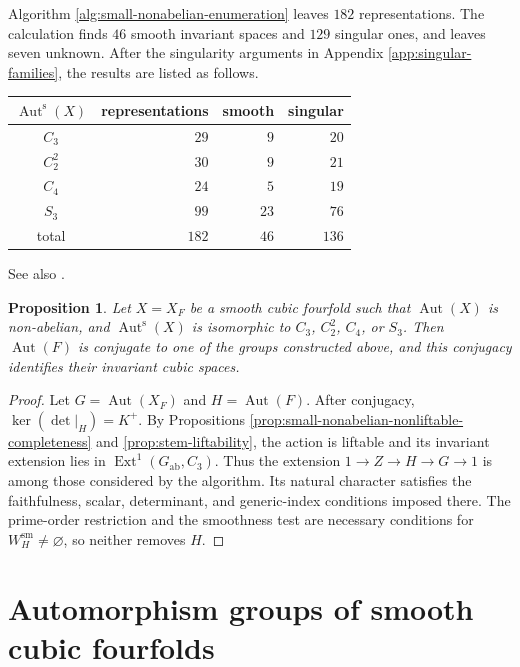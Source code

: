 \documentclass[12pt]{amsart}
\numberwithin{equation}{section}
\theoremstyle{plain}
\newtheorem{prop}[thm]{Proposition}
\theoremstyle{definition}
\theoremstyle{remark}
\DeclareMathOperator{\Aut}{Aut}
\newcommand{\Auts}{\Aut^{\mathrm s}}
\begin{document}
Algorithm \ref{alg:small-nonabelian-enumeration} leaves $182$ representations. The calculation
finds $46$ smooth invariant spaces and $129$ singular ones, and leaves seven
unknown.  After the singularity arguments in Appendix \ref{app:singular-families}, the results are listed as follows.

\begin{center}
\begin{tabular}{c|r|r|r}
$\Auts(X)$ & representations & smooth & singular \\ \hline
$C_3$   & $29$ & $9$  & $20$ \\
$C_2^2$ & $30$ & $9$  & $21$ \\
$C_4$   & $24$ & $5$  & $19$ \\
$S_3$   & $99$ & $23$ & $76$ \\ \hline
total   & $182$ & $46$ & $136$
\end{tabular}
\end{center}

See also .

\begin{prop}\label{prop:small-nonabelian-enumeration-completeness}
Let $X=X_F$ be a smooth cubic fourfold such that $\Aut(X)$ is
non-abelian, and $\Auts(X)$ is isomorphic to $C_3$, $C_2^2$, $C_4$,
or $S_3$.  Then $\Aut(F)$ is conjugate to one of the groups constructed
above, and this conjugacy identifies their invariant cubic spaces.
\end{prop}

\begin{proof}
Let $G=\Aut(X_F)$ and $H=\Aut(F)$.  After conjugacy,
$\ker(\det|_H)=K^+$.  By Propositions
\ref{prop:small-nonabelian-nonliftable-completeness} and
\ref{prop:stem-liftability}, the action is liftable and its invariant
extension lies in $\operatorname{Ext}^1(G_{\mathrm{ab}},C_3)$.  Thus
the extension $1\to Z\to H\to G\to1$ is among those considered by the algorithm.
Its natural character satisfies the faithfulness, scalar, determinant, and
generic-index conditions imposed there.  The prime-order restriction and
the smoothness test are necessary conditions for $W_H^{\mathrm{sm}}\ne
\varnothing$, so neither removes $H$.
\end{proof}


\section{Automorphism groups of smooth cubic fourfolds}
\label{sec:fourfold-completion}
\end{document}
